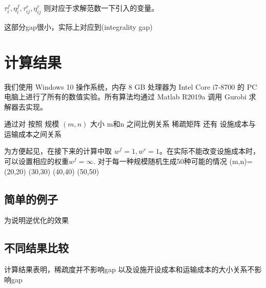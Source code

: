\documentclass[UTF8]{article}
\begin{document}
$\tau_{i}^{f},\eta_{i}^{f},\tau_{i j}^r,\eta_{i j}^{r}$ 则对应于求解范数一下引入的变量。 \par


这部分gap很小，实际上对应到(integrality gap)

%
%

\section{计算结果}

我们使用 Windows 10 操作系统，内存 8 GB 处理器为 Intel Core i7-8700 的 PC 电脑上进行了所有的数值实验。所有算法均通过 Matlab R2019a 调用 Gurobi 求解器去实现。

通过对
按照 规模 $(m,n)$ 大小  m和n 之间比例关系 稀疏矩阵 还有  设施成本与运输成本之间关系

为方便起见，在接下来的计算中取 $w^f=1,w^r=1$。在实际不能改变设施成本时，可以设置相应的权重$w^f=\infty$.
对于每一种规模随机生成50种可能的情况
(m,n)= (20,20) (30,30) (40,40) (50,50)



\subsection{简单的例子}
为说明逆优化的效果

\subsection{不同结果比较}

计算结果表明，稀疏度并不影响gap
以及设施开设成本和运输成本的大小关系不影响gap
\end{document}
